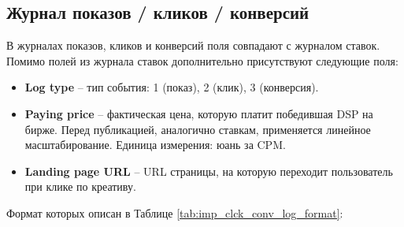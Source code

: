 \subsection{Журнал показов / кликов / конверсий}
В журналах показов, кликов и конверсий поля совпадают с журналом ставок. Помимо полей из журнала ставок дополнительно присутствуют следующие поля:

\begin{itemize}
    \item \textbf{Log type} -- тип события: 1 (показ), 2 (клик), 3 (конверсия).
    \item \textbf{Paying price} -- фактическая цена, которую платит победившая DSP на бирже. Перед публикацией, аналогично ставкам, применяется линейное масштабирование. Единица измерения: юань за CPM.
    \item \textbf{Landing page URL} -- URL страницы, на которую переходит пользователь при клике по креативу.
\end{itemize}

Формат которых описан в Таблице \ref{tab:imp_clck_conv_log_format}:


